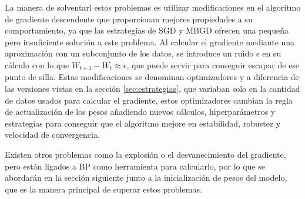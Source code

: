 La manera de solventarl estos problemas es utilizar modificaciones en el algoritmo de gradiente descendente que proporcionan mejores propiedades a su comportamiento, ya que las estrategias de SGD y MBGD ofrecen una pequeña pero insuficiente solución a este problema. Al calcular el gradiente mediante una aproximación con un subconjunto de los datos, se introduce un ruido $\epsilon$ en su cálculo con lo que $W_{t+1} - W_t \approx \epsilon$, que puede servir para conseguir escapar de ese punto de silla. Estas modificaciones se denominan optimizadores y a diferencia de las versiones vistas en la sección \ref{sec:estrategias}, que variaban solo en la cantidad de datos usados para calcular el gradiente, estos optimizadores cambian la regla de actualización de los pesos añadiendo nuevos cálculos, hiperparámetros y estrategias para conseguir que el algoritmo mejore en estabilidad, robustez y velocidad de convergencia.


Existen otros problemas como la explosión o el desvanecimiento del gradiente, pero están ligados a BP como herramienta para calcularlo, por lo que se abordarán en la sección siguiente junto a la inicialización de pesos del modelo, que es la manera principal de superar estos problemas.





